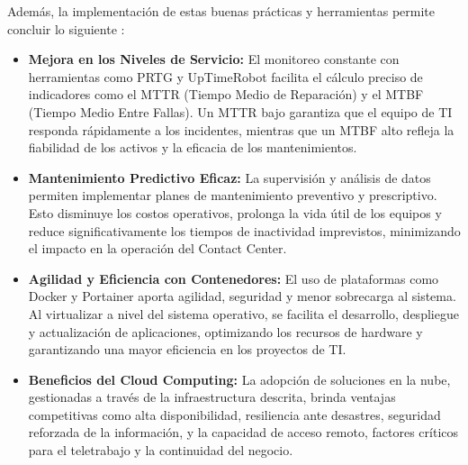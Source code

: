 	Además, la implementación de estas buenas prácticas y herramientas permite concluir lo siguiente \parencite{sena2026servidores, sena2026redes}:
	
	\begin{itemize}
		\item \textbf{Mejora en los Niveles de Servicio:} El monitoreo constante con herramientas como PRTG y UpTimeRobot facilita el cálculo preciso de indicadores como el MTTR (Tiempo Medio de Reparación) y el MTBF (Tiempo Medio Entre Fallas). Un MTTR bajo garantiza que el equipo de TI responda rápidamente a los incidentes, mientras que un MTBF alto refleja la fiabilidad de los activos y la eficacia de los mantenimientos.
		\item \textbf{Mantenimiento Predictivo Eficaz:} La supervisión y análisis de datos permiten implementar planes de mantenimiento preventivo y prescriptivo. Esto disminuye los costos operativos, prolonga la vida útil de los equipos y reduce significativamente los tiempos de inactividad imprevistos, minimizando el impacto en la operación del Contact Center.
		\item \textbf{Agilidad y Eficiencia con Contenedores:} El uso de plataformas como Docker y Portainer aporta agilidad, seguridad y menor sobrecarga al sistema. Al virtualizar a nivel del sistema operativo, se facilita el desarrollo, despliegue y actualización de aplicaciones, optimizando los recursos de hardware y garantizando una mayor eficiencia en los proyectos de TI.
		\item \textbf{Beneficios del Cloud Computing:} La adopción de soluciones en la nube, gestionadas a través de la infraestructura descrita, brinda ventajas competitivas como alta disponibilidad, resiliencia ante desastres, seguridad reforzada de la información, y la capacidad de acceso remoto, factores críticos para el teletrabajo y la continuidad del negocio.
	\end{itemize}
	
	\nocite{*} 
	\printbibliography[title={Referencias}]
	
